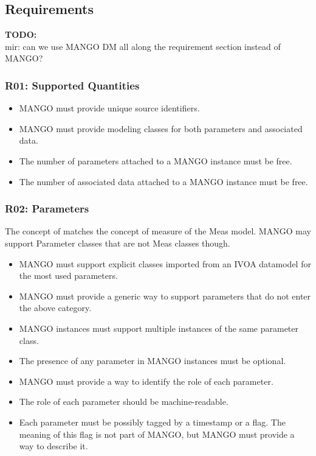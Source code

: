 \documentclass[11pt,a4paper]{ivoa}
\newcommand{\TODO}[1]{%
    \noindent%
    \colorbox{todocolor}{%
            \parbox{0.85\linewidth}{\sffamily \textbf{TODO:}\\
            #1}
    }%
    \vspace{2pt}

}
\begin{document}
\subsection{Requirements}
\TODO{mir: can we use MANGO DM all along the requirement section instead of MANGO?  }

\subsubsection{R01: Supported Quantities}
\begin{itemize}
    \item MANGO must provide unique source identifiers.
    \item MANGO must provide modeling classes for both parameters and associated data.
    \item The number of parameters attached to a MANGO instance must be free.
    \item The number of associated data attached to a MANGO instance must be free.
\end{itemize}

\subsubsection{R02: Parameters}
The concept of  matches the concept of measure of the Meas model. MANGO may support Parameter classes that are not Meas classes though.


\begin{itemize}
    \item MANGO must support explicit classes imported from an IVOA datamodel for the most used parameters.
    \item MANGO must provide a generic way to support parameters that do not enter the above category.
    \item MANGO instances must support multiple instances of the same parameter class.
    \item The presence of any parameter in MANGO instances must be optional.
    \item MANGO must provide a way to identify the role of each parameter.
    \item The role of each parameter should be machine-readable.
    \item Each parameter must be possibly tagged by a timestamp or a flag. The meaning of this flag is not part of MANGO, but MANGO must provide a way to describe it.
\end{itemize}
\end{document}

